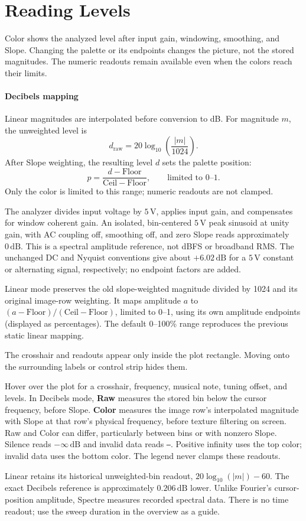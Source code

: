 \section{Reading Levels}\label{sec:levels}

Color shows the analyzed level after input gain, windowing, smoothing,
and Slope. Changing the palette or its endpoints changes the picture,
not the stored magnitudes. The numeric readouts remain available even when
the colors reach their limits.

\paragraph{Decibels mapping}
Linear magnitudes are interpolated before conversion to dB. For magnitude
$m$, the unweighted level is
\[
  d_{\mathrm{raw}} = 20\log_{10}\!\left(\frac{|m|}{1024}\right).
\]
After Slope weighting, the resulting level $d$ sets the palette position:
\[
  p = \frac{d-\mathrm{Floor}}{\mathrm{Ceil}-\mathrm{Floor}},
  \qquad \text{limited to }0\text{--}1.
\]
Only the color is limited to this range; numeric readouts are not clamped.

The analyzer divides input voltage by $5\,\mathrm{V}$, applies input gain,
and compensates for window coherent gain. An isolated, bin-centered
$5\,\mathrm{V}$ peak sinusoid at unity gain, with AC coupling off, smoothing
off, and zero Slope reads approximately $0\,\mathrm{dB}$. This is a spectral
amplitude reference, not dBFS or broadband RMS. The unchanged DC and Nyquist
conventions give about $+6.02\,\mathrm{dB}$ for a $5\,\mathrm{V}$ constant
or alternating signal, respectively; no endpoint factors are added.

Linear mode preserves the old slope-weighted magnitude divided by
1024 and its original image-row weighting. It maps amplitude $a$ to
$(a-\mathrm{Floor})/(\mathrm{Ceil}-\mathrm{Floor})$, limited to 0--1,
using its own amplitude endpoints (displayed as percentages). The default
0--100\% range reproduces the previous static linear mapping.


The crosshair and readouts appear only inside the plot rectangle. Moving
onto the surrounding labels or control strip hides them.

Hover over the plot for a crosshair, frequency, musical note, tuning offset,
and levels. In Decibels mode, \textbf{Raw} measures the stored bin below the
cursor frequency, before Slope. \textbf{Color} measures the image row's
interpolated magnitude with Slope at that row's physical frequency, before
texture filtering on screen. Raw and Color can differ, particularly between
bins or with nonzero Slope. Silence reads $-\infty\,\mathrm{dB}$ and invalid
data reads \texttt{--}. Positive infinity uses the top color; invalid data
uses the bottom color. The legend never clamps these readouts.

Linear retains its historical unweighted-bin readout,
$20\log_{10}(|m|)-60$. The exact Decibels reference is approximately
$0.206\,\mathrm{dB}$ lower. Unlike Fourier's cursor-position amplitude,
Spectre measures recorded spectral data. There is no time readout; use the
sweep duration in the overview as a guide.
